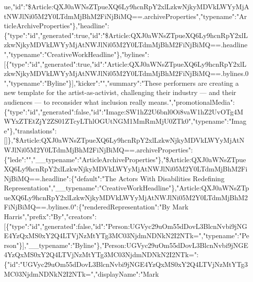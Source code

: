 ue,"id":"\$Article:QXJ0aWNsZTpueXQ6Ly9hcnRpY2xlLzkwNjkyMDVkLWYyMjAtNWJlNi05M2Y0LTdmMjBhM2FiNjBiMQ==.archiveProperties","typename":"ArticleArchiveProperties"\},"headline":\{"type":"id","generated":true,"id":"\$Article:QXJ0aWNsZTpueXQ6Ly9hcnRpY2xlLzkwNjkyMDVkLWYyMjAtNWJlNi05M2Y0LTdmMjBhM2FiNjBiMQ==.headline","typename":"CreativeWorkHeadline"\},"bylines":{[}\{"type":"id","generated":true,"id":"Article:QXJ0aWNsZTpueXQ6Ly9hcnRpY2xlLzkwNjkyMDVkLWYyMjAtNWJlNi05M2Y0LTdmMjBhM2FiNjBiMQ==.bylines.0","typename":"Byline"\}{]},"kicker":"","summary":"These
performers are creating a new template for the artist-as-activist,
challenging their industry --- and their audiences --- to reconsider
what inclusion really
means.","promotionalMedia":\{"type":"id","generated":false,"id":"Image:SW1hZ2U6bnl0Oi8vaW1hZ2UvOTg4MWYxZTEtZjY2ZS01ZTcyLThlOGUtNGM1MmRmMjU0ZTk0","typename":"Image"\},"translations":{[}{]}\},"\$Article:QXJ0aWNsZTpueXQ6Ly9hcnRpY2xlLzkwNjkyMDVkLWYyMjAtNWJlNi05M2Y0LTdmMjBhM2FiNjBiMQ==.archiveProperties":\{"lede":"","\_\_typename":"ArticleArchiveProperties"\},"\$Article:QXJ0aWNsZTpueXQ6Ly9hcnRpY2xlLzkwNjkyMDVkLWYyMjAtNWJlNi05M2Y0LTdmMjBhM2FiNjBiMQ==.headline":\{"default":"The
Actors With Disabilities Redefining
Representation","\_\_typename":"CreativeWorkHeadline"\},"Article:QXJ0aWNsZTpueXQ6Ly9hcnRpY2xlLzkwNjkyMDVkLWYyMjAtNWJlNi05M2Y0LTdmMjBhM2FiNjBiMQ==.bylines.0":\{"renderedRepresentation":"By
Mark
Harris","prefix":"By","creators":{[}\{"type":"id","generated":false,"id":"Person:UGVyc29uOm55dDovL3BlcnNvbi9jNGE4YzQxMS0xY2Q4LTVjNzMtYTg3MC03NjdmNDNkN2I2NTk=","typename":"Person"\}{]},"\_\_typename":"Byline"\},"Person:UGVyc29uOm55dDovL3BlcnNvbi9jNGE4YzQxMS0xY2Q4LTVjNzMtYTg3MC03NjdmNDNkN2I2NTk=":\{"id":"UGVyc29uOm55dDovL3BlcnNvbi9jNGE4YzQxMS0xY2Q4LTVjNzMtYTg3MC03NjdmNDNkN2I2NTk=","displayName":"Mark
